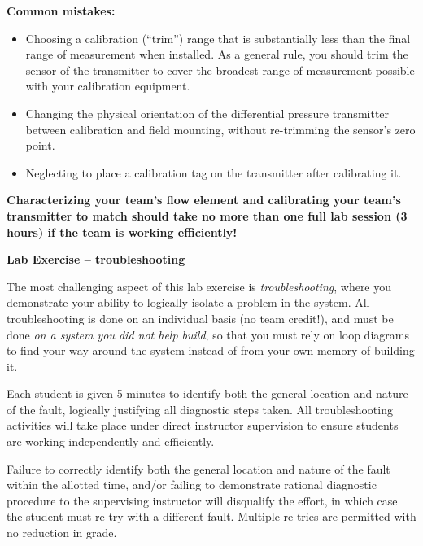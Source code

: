 \vskip 10pt

{\bf Common mistakes:}

\begin{itemize}
\item{} Choosing a calibration (``trim'') range that is substantially less than the final range of measurement when installed.  As a general rule, you should trim the sensor of the transmitter to cover the broadest range of measurement possible with your calibration equipment.
\item{} Changing the physical orientation of the differential pressure transmitter between calibration and field mounting, without re-trimming the sensor's zero point.  
\item{} Neglecting to place a calibration tag on the transmitter after calibrating it.
\end{itemize}

\vskip 10pt

{\bf Characterizing your team's flow element and calibrating your team's transmitter to match should take no more than one full lab session (3 hours) if the team is working efficiently!}





\vfil \eject

\noindent
{\bf Lab Exercise -- troubleshooting}

\vskip 5pt

The most challenging aspect of this lab exercise is {\it troubleshooting}, where you demonstrate your ability to logically isolate a problem in the system.  All troubleshooting is done on an individual basis (no team credit!), and must be done {\it on a system you did not help build}, so that you must rely on loop diagrams to find your way around the system instead of from your own memory of building it.

Each student is given 5 minutes to identify both the general location and nature of the fault, logically justifying all diagnostic steps taken.  All troubleshooting activities will take place under direct instructor supervision to ensure students are working independently and efficiently. 

Failure to correctly identify both the general location and nature of the fault within the allotted time, and/or failing to demonstrate rational diagnostic procedure to the supervising instructor will disqualify the effort, in which case the student must re-try with a different fault.  Multiple re-tries are permitted with no reduction in grade.


